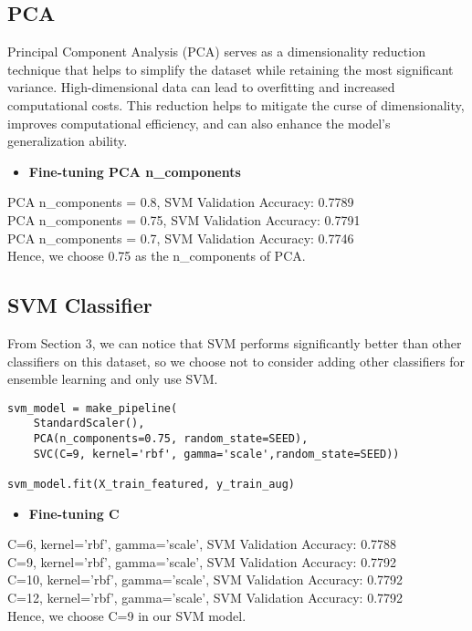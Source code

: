 \documentclass[a4paper,11pt]{article}
\begin{document}
\subsection{PCA}
Principal Component Analysis (PCA) serves as a dimensionality reduction technique that helps to simplify the dataset while retaining the most significant variance. High-dimensional data can lead to overfitting and increased computational costs. This reduction helps to mitigate the curse of dimensionality, improves computational efficiency, and can also enhance the model's generalization ability.
\begin{itemize}
    \item \textbf{Fine-tuning PCA n\_components}
\end{itemize}
PCA n\_components = 0.8, SVM Validation Accuracy: 0.7789 \\
PCA n\_components = 0.75, SVM Validation Accuracy: 0.7791 \\
PCA n\_components = 0.7, SVM Validation Accuracy: 0.7746 \\
Hence, we choose 0.75 as the n\_components of PCA.

\subsection{SVM Classifier}
From Section 3, we can notice that SVM performs significantly better than other classifiers on this dataset, so we choose not to consider adding other classifiers for ensemble learning and only use SVM.

\begin{listing}[!ht]
\begin{verbatim}
svm_model = make_pipeline(
    StandardScaler(), 
    PCA(n_components=0.75, random_state=SEED), 
    SVC(C=9, kernel='rbf', gamma='scale',random_state=SEED))

svm_model.fit(X_train_featured, y_train_aug)
\end{verbatim}
\label{listing:python}
\end{listing}

\begin{itemize}
    \item \textbf{Fine-tuning C}
\end{itemize}
C=6, kernel='rbf', gamma='scale', SVM Validation Accuracy: 0.7788 \\
C=9, kernel='rbf', gamma='scale', SVM Validation Accuracy: 0.7792 \\
C=10, kernel='rbf', gamma='scale', SVM Validation Accuracy: 0.7792 \\
C=12, kernel='rbf', gamma='scale', SVM Validation Accuracy: 0.7792 \\
Hence, we choose C=9 in our SVM model.
\end{document}
